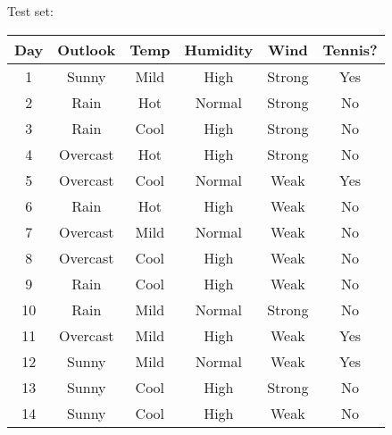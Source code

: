 \documentclass[12pt]{article}
\begin{document}
Test set:
\begin{center}
\begin{tabular}{|c|c|c|c|c|c|} \hline
Day & Outlook & Temp & Humidity & Wind   & Tennis? \\ \hline
1  & Sunny      & Mild     & High      & Strong   & Yes \\ \hline
2  & Rain         & Hot      & Normal & Strong    & No \\ \hline
3  & Rain         & Cool     & High     & Strong   & No \\ \hline
4  & Overcast & Hot      & High     & Strong   & No \\ \hline
5  & Overcast & Cool    & Normal & Weak     & Yes \\ \hline
6  & Rain         & Hot      & High     & Weak     & No \\ \hline
7  & Overcast & Mild     & Normal & Weak     & No \\ \hline
8  & Overcast & Cool    & High     & Weak    & No \\ \hline
9  & Rain         & Cool    & High      & Weak   & No \\ \hline
10 & Rain        & Mild     & Normal & Strong  & No \\ \hline
11 & Overcast & Mild    & High      & Weak    & Yes \\ \hline
12 & Sunny      & Mild    & Normal & Weak    & Yes \\ \hline
13 & Sunny      & Cool    & High     & Strong  & No \\ \hline
14 & Sunny      & Cool    & High     & Weak    & No \\ \hline
\end{tabular}
\end{center}
\end{document}
